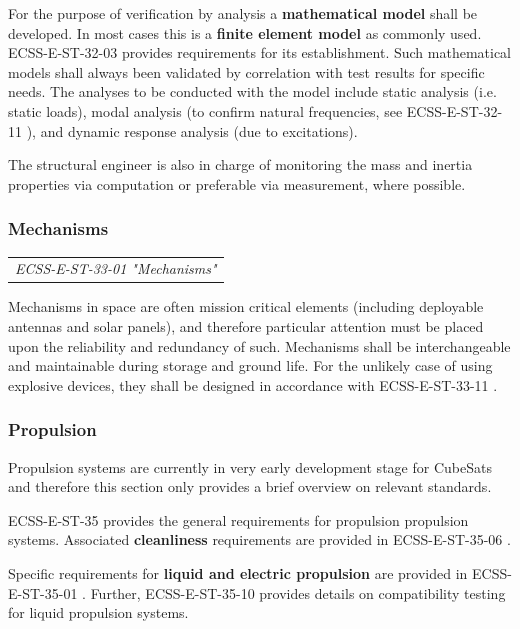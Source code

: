 For the purpose of verification by analysis a \textbf{mathematical model} shall be developed. In most cases this is a \textbf{finite element model} as commonly used. ECSS-E-ST-32-03 \cite{ECSS-E-ST-32-03} provides requirements for its establishment. Such mathematical models shall always been validated by correlation with test results for specific needs. The analyses to be conducted with the model include static analysis (i.e. static loads), modal analysis (to confirm natural frequencies, see ECSS-E-ST-32-11 \cite{ECSS-E-ST-32-11}), and dynamic response analysis (due to excitations).

The structural engineer is also in charge of monitoring the mass and inertia properties via computation or preferable via measurement, where possible. 

\subsubsection{Mechanisms}
\label{ss:Mechanisms}

\begin{tabular}{l}
\textit{ECSS-E-ST-33-01 "Mechanisms" \cite{ECSS-E-ST-33-01}}
\end{tabular}

Mechanisms in space are often mission critical elements (including deployable antennas and solar panels), and therefore particular attention must be placed upon the reliability and redundancy of such. Mechanisms shall be interchangeable and maintainable during storage and ground life. For the unlikely case of using explosive devices, they shall be designed in accordance with ECSS-E-ST-33-11 \cite{ECSS-E-ST-33-11}.

\subsubsection{Propulsion}

Propulsion systems are currently in very early development stage for CubeSats and therefore this section only provides a brief overview on relevant standards.

ECSS-E-ST-35 \cite{ECSS-E-ST-35} provides the general requirements for propulsion propulsion systems. Associated \textbf{cleanliness} requirements are provided in ECSS-E-ST-35-06 \cite{ECSS-E-ST-35-06}.

Specific requirements for \textbf{liquid and electric propulsion} are provided in ECSS-E-ST-35-01 \cite{ECSS-E-ST-35-01}. Further, ECSS-E-ST-35-10 \cite{ECSS-E-ST-35-10} provides details on compatibility testing for liquid propulsion systems. 

